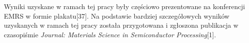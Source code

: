 Wyniki uzyskane w ramach tej pracy były częściowo prezentowane na konferencji EMRS w formie plakatu[37]. Na podstawie bardziej szczegółowych wyników uzyskanych w ramach tej pracy została przygotowana i zgłoszona publikacja w czasopiśmie \textit{Journal: Materials Science in Semiconductor Processing}[1].





